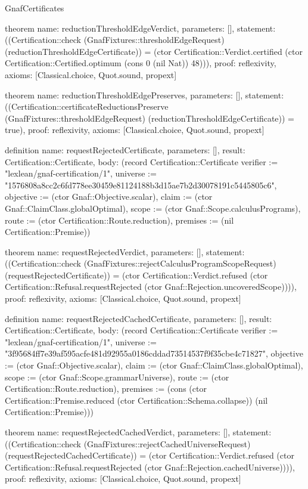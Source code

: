 \begin{lexlean}{GnafCertificates}
\begin{semanticmodule}
theorem{
  name: reductionThresholdEdgeVerdict,
  parameters: [],
  statement: ((Certification::check (GnafFixtures::thresholdEdgeRequest) (reductionThresholdEdgeCertificate)) = (ctor Certification::Verdict.certified (ctor Certification::Certified.optimum (cons 0 (nil Nat)) 48))),
  proof: reflexivity{},
  axioms: [Classical.choice, Quot.sound, propext]
}

theorem{
  name: reductionThresholdEdgePreserves,
  parameters: [],
  statement: ((Certification::certificateReductionsPreserve (GnafFixtures::thresholdEdgeRequest) (reductionThresholdEdgeCertificate)) = true),
  proof: reflexivity{},
  axioms: [Classical.choice, Quot.sound, propext]
}

definition{
  name: requestRejectedCertificate,
  parameters: [],
  result: Certification::Certificate,
  body: (record Certification::Certificate {verifier := "lexlean/gnaf-certification/1", universe := "1576808a8cc2c6fd778ee30459e81124188b3d15ae7b2d30078191c5445805c6", objective := (ctor Gnaf::Objective.scalar), claim := (ctor Gnaf::ClaimClass.globalOptimal), scope := (ctor Gnaf::Scope.calculusPrograms), route := (ctor Certification::Route.reduction), premises := (nil Certification::Premise)})
}

theorem{
  name: requestRejectedVerdict,
  parameters: [],
  statement: ((Certification::check (GnafFixtures::rejectCalculusProgramScopeRequest) (requestRejectedCertificate)) = (ctor Certification::Verdict.refused (ctor Certification::Refusal.requestRejected (ctor Gnaf::Rejection.uncoveredScope)))),
  proof: reflexivity{},
  axioms: [Classical.choice, Quot.sound, propext]
}

definition{
  name: requestRejectedCachedCertificate,
  parameters: [],
  result: Certification::Certificate,
  body: (record Certification::Certificate {verifier := "lexlean/gnaf-certification/1", universe := "3f95684ff7e39af595acfe481d92955a0186cddad73514537f9f35cbe4c71827", objective := (ctor Gnaf::Objective.scalar), claim := (ctor Gnaf::ClaimClass.globalOptimal), scope := (ctor Gnaf::Scope.grammarUniverse), route := (ctor Certification::Route.reduction), premises := (cons (ctor Certification::Premise.reduced (ctor Certification::Schema.collapse)) (nil Certification::Premise))})
}

theorem{
  name: requestRejectedCachedVerdict,
  parameters: [],
  statement: ((Certification::check (GnafFixtures::rejectCachedUniverseRequest) (requestRejectedCachedCertificate)) = (ctor Certification::Verdict.refused (ctor Certification::Refusal.requestRejected (ctor Gnaf::Rejection.cachedUniverse)))),
  proof: reflexivity{},
  axioms: [Classical.choice, Quot.sound, propext]
}


\end{semanticmodule}
\end{lexlean}
